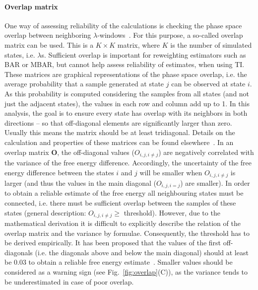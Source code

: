 \documentclass[9pt,bestpractices]{livecoms}
\begin{document}
\paragraph{Overlap matrix}
One way of assessing reliability of the calculations is checking the phase space overlap between neighboring $\lambda$-windows~\cite{wu2005phasespace,wu2005phasespacea}. For this purpose, a so-called overlap matrix can be used. This is a $K\times K$ matrix, where $K$ is the number of simulated states, i.e. $\lambda$s. Sufficient overlap is important for reweighting estimators such as BAR or MBAR, but cannot help assess reliability of estimates, when using TI. 
These matrices are graphical representations of the phase space overlap, i.e. the average probability that a sample generated at state $j$ can be observed at state $i$. As this probability is computed considering the samples from all states (and not just the adjacent states), the values in each row and column add up to 1. In this analysis, the goal is to ensure every state has overlap with its neighbors in both directions -- so that off-diagonal elements are significantly larger than zero. Usually this means the matrix should be at least tridiagonal.
%
Details on the calculation and properties of these matrices can be found elsewhere~\cite{klimovich2015guidelines}.
In an overlap matrix $\mathbf{O}$, the off-diagonal values (${O}_{i,j,i\ne j}$) are negatively correlated with the variance of the free energy difference. Accordingly, the uncertainty of the free energy difference between the states $i$ and $j$ will be smaller when ${O}_{i,j,i\ne j}$ is larger (and thus the values in the main diagonal (${O}_{i,j,i=j}$) are smaller). In order to obtain a reliable estimate of the free energy all neighbouring states must be connected, i.e. there must be sufficient overlap between the samples of these states (general description: ${O}_{i,j,i\ne j}\ge$ threshold).
However, due to the mathematical derivation it is difficult to explicitly describe the relation of the overlap matrix and the variance by formulae. Consequently, the threshold has to be derived empirically. It has been proposed that the values of the first off-diagonals (i.e. the diagonals above and below the main diagonal) should at least be 0.03 to obtain a reliable free energy estimate~\cite{klimovich2015guidelines}. Smaller values should be considered as a warning sign (see Fig.~\ref{fig:overlap}(C)), as the variance tends to be underestimated in case of poor overlap.
\end{document}
